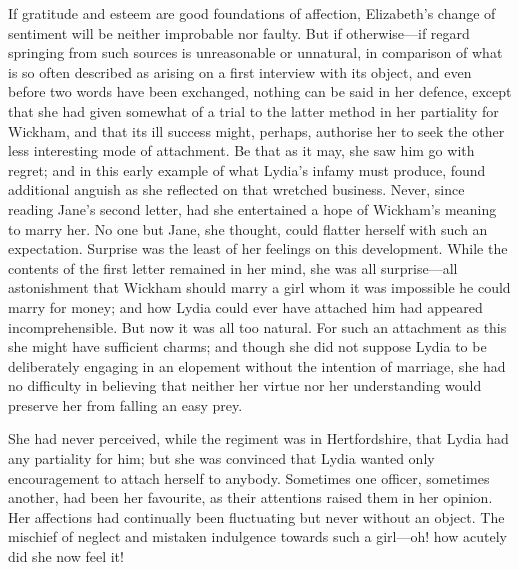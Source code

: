 If gratitude and esteem are good foundations of affection,
Elizabeth's change of sentiment will be neither improbable nor
faulty.  But if otherwise---if regard springing from such sources
is unreasonable or unnatural, in comparison of what is so often
described as arising on a first interview with its object, and even
before two words have been exchanged, nothing can be said in
her defence, except that she had given somewhat of a trial to the
latter method in her partiality for Wickham, and that its ill
success might, perhaps, authorise her to seek the other less
interesting mode of attachment.  Be that as it may, she saw him
go with regret; and in this early example of what Lydia's infamy
must produce, found additional anguish as she reflected on that
wretched business.  Never, since reading Jane's second letter,
had she entertained a hope of Wickham's meaning to marry her.
No one but Jane, she thought, could flatter herself with such an
expectation.  Surprise was the least of her feelings on this
development.  While the contents of the first letter remained in
her mind, she was all surprise---all astonishment that Wickham
should marry a girl whom it was impossible he could marry
for money; and how Lydia could ever have attached him had
appeared incomprehensible.  But now it was all too natural.  For
such an attachment as this she might have sufficient charms; and
though she did not suppose Lydia to be deliberately engaging in
an elopement without the intention of marriage, she had no
difficulty in believing that neither her virtue nor her
understanding would preserve her from falling an easy prey.

She had never perceived, while the regiment was in Hertfordshire,
that Lydia had any partiality for him; but she was convinced that
Lydia wanted only encouragement to attach herself to anybody.
Sometimes one officer, sometimes another, had been her favourite,
as their attentions raised them in her opinion.  Her affections
had continually been fluctuating but never without an object.
The mischief of neglect and mistaken indulgence towards such a
girl---oh! how acutely did she now feel it!


